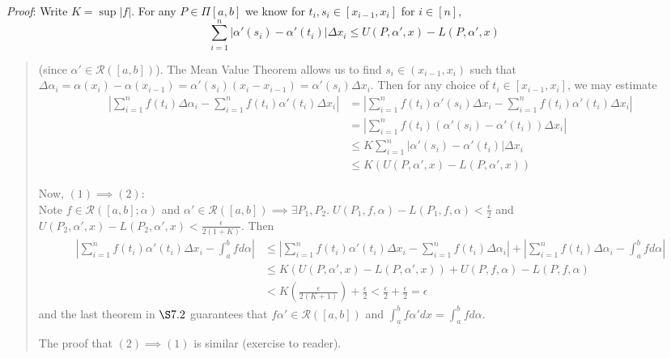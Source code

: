 \documentclass[11pt]{article}
\begin{document}
\emph{Proof}: Write $K = \sup |f|$. For any $P \in \Pi[a,b]$ we know for $t_i, s_i \in [x_{i-1}, x_i]$ for $i \in [n]$,
\begin{displaymath}
\sum_{i=1}^n |\alpha'(s_i) - \alpha'(t_i)| \Delta x_i \leq U(P, \alpha', x) - L(P, \alpha', x)
\end{displaymath}
\begin{quote}\vspace{-0.3cm}
(since $\alpha' \in \mathcal{R}([a,b])$). The Mean Value Theorem allows us to find $s_i \in (x_{i-1}, x_i)$ such that $\Delta \alpha_i = \alpha(x_i) - \alpha(x_{i-1}) = \alpha'(s_i) (x_i - x_{i-1}) = \alpha'(s_i) \Delta x_i$. Then for any choice of $t_i \in [x_{i-1}, x_i]$, we may estimate
\begin{align*}
\left|\sum_{i=1}^n f(t_i) \Delta \alpha_i - \sum_{i=1}^n f(t_i) \alpha'(t_i) \Delta x_i \right| &= \left|\sum_{i=1}^n f(t_i) \alpha'(s_i) \Delta x_i - \sum_{i=1}^n f(t_i) \alpha'(t_i) \Delta x_i\right|\\
&= \left|\sum_{i=1}^n f(t_i) (\alpha'(s_i) - \alpha'(t_i)) \Delta x_i\right|\\
&\leq K \sum_{i=1}^n |\alpha'(s_i) - \alpha'(t_i)| \Delta x_i\\
&\leq K(U(P, \alpha', x) - L(P, \alpha', x))
\end{align*}

Now, $(1) \implies (2)$:\\
Note $f \in \mathcal{R}([a,b]; \alpha)$ and $\alpha' \in \mathcal{R}([a,b]) \implies \exists P_1, P_2.\; U(P_1, f, \alpha) - L(P_1, f, \alpha) < \frac{\epsilon}{2}$ and $U(P_2, \alpha', x) - L(P_2, \alpha', x) < \frac{\epsilon}{2(1+K)}$. Then
\begin{align*}
\left|\sum_{i=1}^n f(t_i) \alpha'(t_i) \Delta x_i - \int_a^b f d\alpha\right| &\leq \left|\sum_{i=1}^n f(t_i) \alpha'(t_i) \Delta x_i - \sum_{i=1}^n f(t_i) \Delta \alpha_i\right| + \left|\sum_{i=1}^n f(t_i) \Delta \alpha_i - \int_a^b f d\alpha\right|\\
&\leq K(U(P, \alpha', x) - L(P, \alpha', x)) + U(P, f, \alpha) - L(P, f, \alpha)\\
& < K\left(\frac{\epsilon}{2(K+1)}\right) + \frac{\epsilon}{2} < \frac{\epsilon}{2} + \frac{\epsilon}{2} = \epsilon
\end{align*}
and the last theorem in $\S 7.2$ guarantees that $f \alpha' \in \mathcal{R}([a,b])$ and $\int_a^b f \alpha' dx = \int_a^b f d\alpha$.

The proof that $(2) \implies (1)$ is similar (exercise to reader).
\end{quote}
\end{document}

